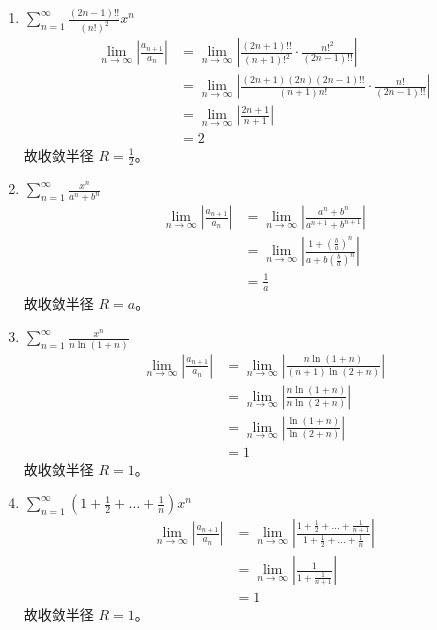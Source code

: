 \begin{solution}
    \begin{enumerate}
        \item \(\sum_{n=1}^{\infty} \frac{(2n-1)!!}{(n!)^2} x^n\)
            \begin{align*}
                \lim_{n \to \infty} \left| \frac{a_{n+1}}{a_n}
                \right| &= \lim_{n \to \infty} \left|
                \frac{(2n+1)!!}{(n+1)!^2} \cdot
                \frac{n!^2}{(2n-1)!!} \right| \\
                &= \lim_{n \to \infty} \left|
                \frac{(2n+1)(2n)(2n-1)!!}{(n+1)n!} \cdot
                \frac{n!}{(2n-1)!!} \right| \\
                &= \lim_{n \to \infty} \left|
                \frac{2n+1}{n+1} \right| \\
                &= 2
            \end{align*}
            故收敛半径 \(R = \frac{1}{2}\)。
        \item \(\sum_{n=1}^{\infty} \frac{x^{n}}{a^{n} + b^{n}}\)
            \begin{align*}
                \lim_{n \to \infty} \left| \frac{a_{n+1}}{a_n}
                \right| &= \lim_{n \to \infty} \left| \frac{a^n +
                b^n}{a^{n+1} + b^{n+1}} \right| \\
                &= \lim_{n \to \infty} \left| \frac{1 +
                \left(\frac{b}{a}\right)^n}{a + b
                \left(\frac{b}{a}\right)^n} \right| \\
                &= \frac{1}{a}
            \end{align*}
            故收敛半径 \(R = a\)。
        \item \(\sum_{n=1}^{\infty} \frac{x^n}{n \ln(1+n)}\)
            \begin{align*}
                \lim_{n \to \infty} \left| \frac{a_{n+1}}{a_n}
                \right| &= \lim_{n \to \infty} \left| \frac{n
                \ln(1+n)}{(n+1) \ln(2+n)} \right| \\
                &= \lim_{n \to \infty} \left| \frac{n \ln(1+n)}{n
                \ln(2+n)} \right| \\
                &= \lim_{n \to \infty} \left|
                \frac{\ln(1+n)}{\ln(2+n)} \right| \\
                &= 1
            \end{align*}
            故收敛半径 \(R = 1\)。
        \item \(\sum_{n=1}^{\infty} \left(1 + \frac{1}{2} + \dots +
            \frac{1}{n}\right) x^n\)
            \begin{align*}
                \lim_{n \to \infty} \left| \frac{a_{n+1}}{a_n}
                \right| &= \lim_{n \to \infty} \left| \frac{1 +
                \frac{1}{2} + \dots + \frac{1}{n+1}}{1 + \frac{1}{2}
                + \dots + \frac{1}{n}} \right| \\
                &= \lim_{n \to \infty} \left| \frac{1}{1 +
                \frac{1}{n+1}} \right| \\
                &= 1
            \end{align*}
            故收敛半径 \(R = 1\)。
    \end{enumerate}
\end{solution}
